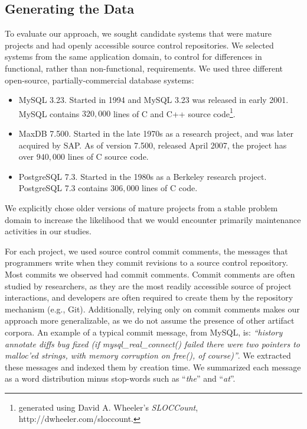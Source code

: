 \documentclass[smallextended]{svjour3}       %
\begin{document}
\subsection{Generating the Data}
\label{sec:wordlist}

To evaluate our approach, we sought candidate systems that were mature projects and had openly accessible source control repositories. 
We selected systems from the same application domain, to control for differences in functional, rather than non-functional, requirements. 
We used three different open-source, partially-commercial database systems:
\begin{itemize}
\item  MySQL 3.23. Started in 1994 and MySQL 3.23 was released in early 2001. MySQL contains $320,000$ lines of C and C++ source code\footnote{generated using David A. Wheeler's \emph{SLOCCount}, {http://dwheeler.com/sloccount}.}.
\item MaxDB 7.500. Started in the late 1970s as a research project, and was later acquired by SAP. As of version 7.500, released April 2007, the project has over $940,000$ lines of C source code. 
\item PostgreSQL 7.3. Started in the 1980s as a Berkeley research project. PostgreSQL 7.3 contains $306,000$ lines of C code.
\end{itemize}
  
We explicitly chose older versions of mature projects from a stable problem domain to increase the likelihood that we would encounter primarily maintenance activities in our studies.

For each project, we used source control commit comments, the messages
that programmers write when they commit revisions to a source control
repository. 
Most commits we observed had commit comments.
Commit comments are often studied by researchers, as they are the most readily accessible source of project interactions, and developers are often required to create them by the repository mechanism (e.g., Git).  Additionally, relying only on commit comments makes our approach more generalizable, as we do not assume the presence of other artifact corpora.
An example of a typical commit message, from MySQL, is: \textit{``history annotate diffs bug fixed (if mysql\-\_real\-\_connect() failed there were two pointers to malloc'ed strings, with memory corruption on free(), of course)''}. 
We extracted these messages and indexed them by creation time. 
We summarized each message as a word distribution minus stop-words such as ``\emph{the}'' and ``\emph{at}''. 
\end{document}
